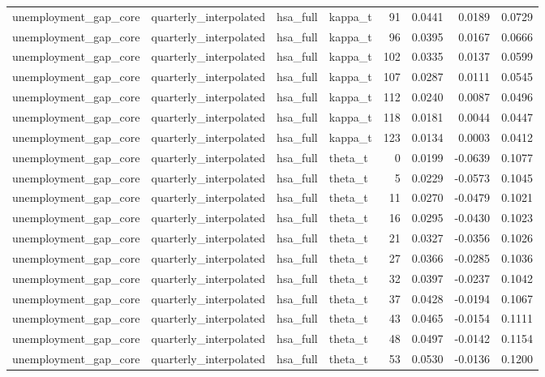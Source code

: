 \begin{tabular}{llllrrrr}
unemployment\_gap\_core & quarterly\_interpolated & hsa\_full & kappa\_t & 91 & 0.0441 & 0.0189 & 0.0729 \\
unemployment\_gap\_core & quarterly\_interpolated & hsa\_full & kappa\_t & 96 & 0.0395 & 0.0167 & 0.0666 \\
unemployment\_gap\_core & quarterly\_interpolated & hsa\_full & kappa\_t & 102 & 0.0335 & 0.0137 & 0.0599 \\
unemployment\_gap\_core & quarterly\_interpolated & hsa\_full & kappa\_t & 107 & 0.0287 & 0.0111 & 0.0545 \\
unemployment\_gap\_core & quarterly\_interpolated & hsa\_full & kappa\_t & 112 & 0.0240 & 0.0087 & 0.0496 \\
unemployment\_gap\_core & quarterly\_interpolated & hsa\_full & kappa\_t & 118 & 0.0181 & 0.0044 & 0.0447 \\
unemployment\_gap\_core & quarterly\_interpolated & hsa\_full & kappa\_t & 123 & 0.0134 & 0.0003 & 0.0412 \\
unemployment\_gap\_core & quarterly\_interpolated & hsa\_full & theta\_t & 0 & 0.0199 & -0.0639 & 0.1077 \\
unemployment\_gap\_core & quarterly\_interpolated & hsa\_full & theta\_t & 5 & 0.0229 & -0.0573 & 0.1045 \\
unemployment\_gap\_core & quarterly\_interpolated & hsa\_full & theta\_t & 11 & 0.0270 & -0.0479 & 0.1021 \\
unemployment\_gap\_core & quarterly\_interpolated & hsa\_full & theta\_t & 16 & 0.0295 & -0.0430 & 0.1023 \\
unemployment\_gap\_core & quarterly\_interpolated & hsa\_full & theta\_t & 21 & 0.0327 & -0.0356 & 0.1026 \\
unemployment\_gap\_core & quarterly\_interpolated & hsa\_full & theta\_t & 27 & 0.0366 & -0.0285 & 0.1036 \\
unemployment\_gap\_core & quarterly\_interpolated & hsa\_full & theta\_t & 32 & 0.0397 & -0.0237 & 0.1042 \\
unemployment\_gap\_core & quarterly\_interpolated & hsa\_full & theta\_t & 37 & 0.0428 & -0.0194 & 0.1067 \\
unemployment\_gap\_core & quarterly\_interpolated & hsa\_full & theta\_t & 43 & 0.0465 & -0.0154 & 0.1111 \\
unemployment\_gap\_core & quarterly\_interpolated & hsa\_full & theta\_t & 48 & 0.0497 & -0.0142 & 0.1154 \\
unemployment\_gap\_core & quarterly\_interpolated & hsa\_full & theta\_t & 53 & 0.0530 & -0.0136 & 0.1200 \\

\end{tabular}
